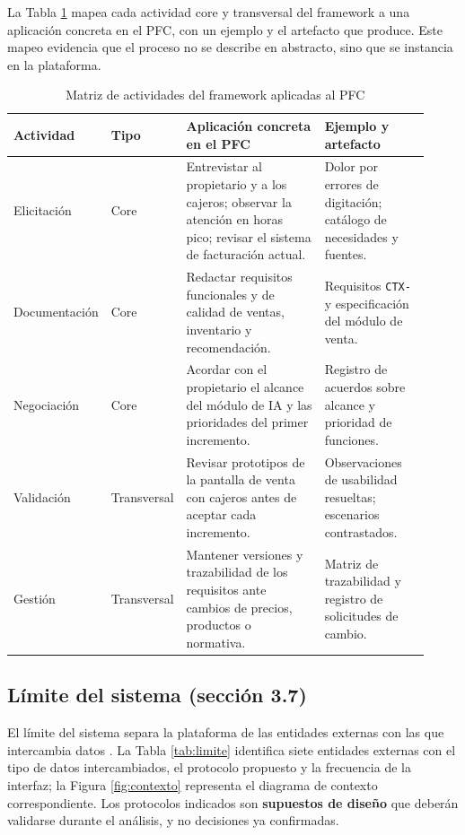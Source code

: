 \documentclass[onecolumn,12pt]{IEEEtran}
\begin{document}
La Tabla \ref{tab:framework-pfc} mapea cada actividad core y transversal del framework a una aplicaci\'on concreta en el PFC, con un ejemplo y el artefacto que produce. Este mapeo evidencia que el proceso no se describe en abstracto, sino que se instancia en la plataforma.

\begin{table}[htbp]
\caption{Matriz de actividades del framework aplicadas al PFC}
\label{tab:framework-pfc}
\centering
\footnotesize
\begin{tabular}{@{}p{0.17\linewidth}p{0.10\linewidth}p{0.38\linewidth}p{0.27\linewidth}@{}}
\toprule
\textbf{Actividad} & \textbf{Tipo} & \textbf{Aplicaci\'on concreta en el PFC} & \textbf{Ejemplo y artefacto}\\
\midrule
Elicitaci\'on & Core & Entrevistar al propietario y a los cajeros; observar la atenci\'on en horas pico; revisar el sistema de facturaci\'on actual. & Dolor por errores de digitaci\'on; cat\'alogo de necesidades y fuentes.\\
Documentaci\'on & Core & Redactar requisitos funcionales y de calidad de ventas, inventario y recomendaci\'on. & Requisitos \texttt{CTX-} y especificaci\'on del m\'odulo de venta.\\
Negociaci\'on & Core & Acordar con el propietario el alcance del m\'odulo de IA y las prioridades del primer incremento. & Registro de acuerdos sobre alcance y prioridad de funciones.\\
Validaci\'on & Transversal & Revisar prototipos de la pantalla de venta con cajeros antes de aceptar cada incremento. & Observaciones de usabilidad resueltas; escenarios contrastados.\\
Gesti\'on & Transversal & Mantener versiones y trazabilidad de los requisitos ante cambios de precios, productos o normativa. & Matriz de trazabilidad y registro de solicitudes de cambio.\\
\bottomrule
\end{tabular}
\end{table}

\subsection{L\'imite del sistema (secci\'on 3.7)}
El l\'imite del sistema separa la plataforma de las entidades externas con las que intercambia datos \cite{pohl2025}. La Tabla \ref{tab:limite} identifica siete entidades externas con el tipo de datos intercambiados, el protocolo propuesto y la frecuencia de la interfaz; la Figura \ref{fig:contexto} representa el diagrama de contexto correspondiente. Los protocolos indicados son \textbf{supuestos de dise\~no} que deber\'an validarse durante el an\'alisis, y no decisiones ya confirmadas.
\end{document}
